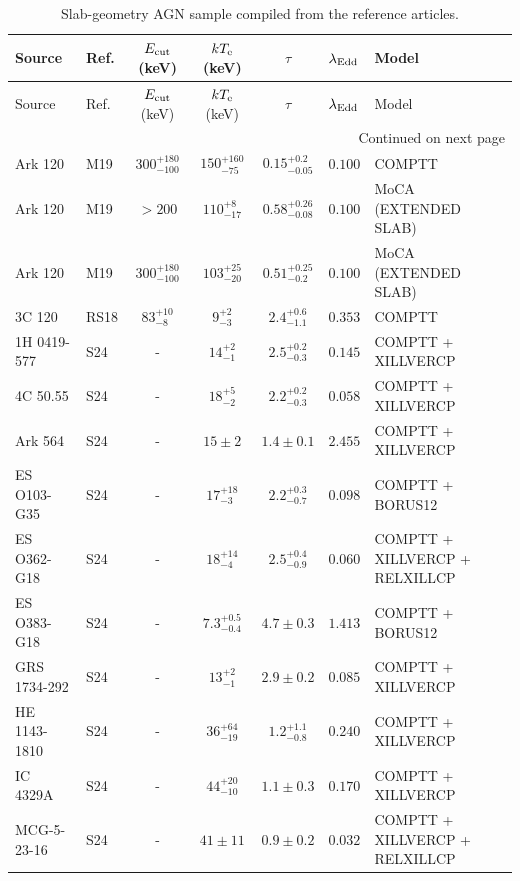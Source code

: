 \begingroup
\setlength{\tabcolsep}{5pt}
\renewcommand{\arraystretch}{1.12}
\small
\begin{longtable}{llcccll}
\caption{Slab-geometry AGN sample compiled from the reference articles.}\\
\toprule
Source & Ref. & $E_{\rm cut}$ (keV) & $kT_{\rm e}$ (keV) & $\tau$ & $\lambda_{\rm Edd}$ & Model \\
\midrule
\midrule
\endfirsthead
\toprule
Source & Ref. & $E_{\rm cut}$ (keV) & $kT_{\rm e}$ (keV) & $\tau$ & $\lambda_{\rm Edd}$ & Model \\
\midrule
\midrule
\endhead
\midrule
\multicolumn{7}{r}{Continued on next page} \\
\midrule
\endfoot
\bottomrule
\endlastfoot
Ark 120 & M19 & $300^{+180}_{-100}$ & $150^{+160}_{-75}$ & $0.15^{+0.2}_{-0.05}$ & $0.100$ & COMPTT \\
Ark 120 & M19 & $>200$ & $110^{+8}_{-17}$ & $0.58^{+0.26}_{-0.08}$ & $0.100$ & MoCA (EXTENDED SLAB) \\
Ark 120 & M19 & $300^{+180}_{-100}$ & $103^{+25}_{-20}$ & $0.51^{+0.25}_{-0.2}$ & $0.100$ & MoCA (EXTENDED SLAB) \\
3C 120 & RS18 & $83^{+10}_{-8}$ & $9^{+2}_{-3}$ & $2.4^{+0.6}_{-1.1}$ & $0.353$ & COMPTT \\
\midrule
1H 0419-577 & S24 & - & $14^{+2}_{-1}$ & $2.5^{+0.2}_{-0.3}$ & $0.145$ & COMPTT + XILLVERCP \\
4C 50.55 & S24 & - & $18^{+5}_{-2}$ & $2.2^{+0.2}_{-0.3}$ & $0.058$ & COMPTT + XILLVERCP \\
Ark 564 & S24 & - & $15\pm2$ & $1.4\pm0.1$ & $2.455$ & COMPTT + XILLVERCP \\
ES O103-G35 & S24 & - & $17^{+18}_{-3}$ & $2.2^{+0.3}_{-0.7}$ & $0.098$ & COMPTT + BORUS12 \\
ES O362-G18 & S24 & - & $18^{+14}_{-4}$ & $2.5^{+0.4}_{-0.9}$ & $0.060$ & COMPTT + XILLVERCP + RELXILLCP \\
ES O383-G18 & S24 & - & $7.3^{+0.5}_{-0.4}$ & $4.7\pm0.3$ & $1.413$ & COMPTT + BORUS12 \\
GRS 1734-292 & S24 & - & $13^{+2}_{-1}$ & $2.9\pm0.2$ & $0.085$ & COMPTT + XILLVERCP \\
HE 1143-1810 & S24 & - & $36^{+64}_{-19}$ & $1.2^{+1.1}_{-0.8}$ & $0.240$ & COMPTT + XILLVERCP \\
IC 4329A & S24 & - & $44^{+20}_{-10}$ & $1.1\pm0.3$ & $0.170$ & COMPTT + XILLVERCP \\
MCG-5-23-16 & S24 & - & $41\pm11$ & $0.9\pm0.2$ & $0.032$ & COMPTT + XILLVERCP + RELXILLCP \\

\end{longtable}
